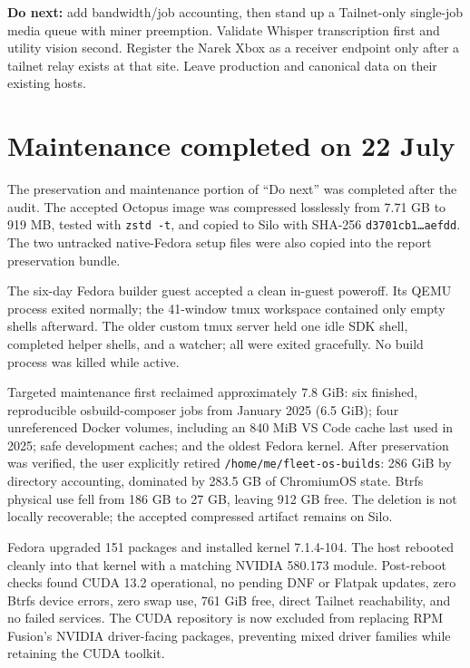 \documentclass[11pt,letterpaper]{article}
\newcommand{\mono}[1]{\texttt{#1}}
\begin{document}
\begin{decisionbox}
\textbf{Do next:} add bandwidth/job accounting, then stand up a Tailnet-only single-job media queue with miner preemption. Validate Whisper transcription first and utility vision second. Register the Narek Xbox as a receiver endpoint only after a tailnet relay exists at that site. Leave production and canonical data on their existing hosts.
\end{decisionbox}

\section{Maintenance completed on 22 July}

The preservation and maintenance portion of ``Do next'' was completed after the audit. The accepted Octopus image was compressed losslessly from 7.71 GB to 919 MB, tested with \mono{zstd -t}, and copied to Silo with SHA-256 \mono{d3701cb1\ldots aefdd}. The two untracked native-Fedora setup files were also copied into the report preservation bundle.

The six-day Fedora builder guest accepted a clean in-guest poweroff. Its QEMU process exited normally; the 41-window tmux workspace contained only empty shells afterward. The older custom tmux server held one idle SDK shell, completed helper shells, and a watcher; all were exited gracefully. No build process was killed while active.

Targeted maintenance first reclaimed approximately 7.8 GiB: six finished, reproducible osbuild-composer jobs from January 2025 (6.5 GiB); four unreferenced Docker volumes, including an 840 MiB VS Code cache last used in 2025; safe development caches; and the oldest Fedora kernel. After preservation was verified, the user explicitly retired \mono{/home/me/fleet-os-builds}: 286 GiB by directory accounting, dominated by 283.5 GB of ChromiumOS state. Btrfs physical use fell from 186 GB to 27 GB, leaving 912 GB free. The deletion is not locally recoverable; the accepted compressed artifact remains on Silo.

Fedora upgraded 151 packages and installed kernel 7.1.4-104. The host rebooted cleanly into that kernel with a matching NVIDIA 580.173 module. Post-reboot checks found CUDA 13.2 operational, no pending DNF or Flatpak updates, zero Btrfs device errors, zero swap use, 761 GiB free, direct Tailnet reachability, and no failed services. The CUDA repository is now excluded from replacing RPM Fusion's NVIDIA driver-facing packages, preventing mixed driver families while retaining the CUDA toolkit.
\end{document}

